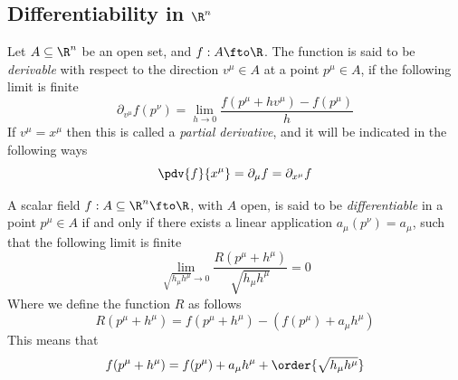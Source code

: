 \documentclass[../mmf.tex]{subfiles}
\begin{document}
\subsection{Differentiability in $\R^n$}
\begin{dfn}
	Let $A\subseteq\R^n$ be an open set, and $f:A\fto\R$. The function is said to be \textit{derivable} with respect to the direction $v^\mu\in A$ at a point $p^\mu\in A$, if the following limit is finite
	\begin{equation}
		\partial_{v^\mu}f(p^\nu)=\lim_{h\to0}\frac{f(p^\mu+hv^\mu)-f(p^\mu)}{h}
		\label{eq:directionalder}
	\end{equation}
	If $v^\mu=x^\mu$ then this is called a \textit{partial derivative}, and it will be indicated in the following ways
	\begin{equation}
		\pdv{f}{x^\mu}=\partial_\mu f=\partial_{x^\mu}f
		\label{eq:partialdernot}
	\end{equation}
\end{dfn}
\begin{dfn}[Differentiability]
	A scalar field $f:A\subseteq\R^n\fto\R$, with $A$ open, is said to be \textit{differentiable} in a point $p^\mu\in A$ if and only if there exists a linear application $a_\mu(p^\nu)=a_\mu$, such that the following limit is finite
	\begin{equation}
		\lim_{\sqrt{h_\mu h^\mu}\to0}\frac{R(p^\mu+h^\mu)}{\sqrt{h_\mu h^\mu}}=0
		\label{eq:limitrest}
	\end{equation}
	Where we define the function $R$ as follows
	\begin{equation}
		R(p^\mu+h^\mu)=f(p^\mu+h^\mu)-\left( f(p^\mu)+a_\mu h^\mu \right)
		\label{eq:restfunc}
	\end{equation}
	This means that
	\begin{equation}
		f(p^\mu+h^\mu)=f(p^\mu)+a_\mu h^\mu+\order{\sqrt{h_\mu h^\mu}}
		\label{eq:diff}
	\end{equation}
\end{dfn}
\end{document}

